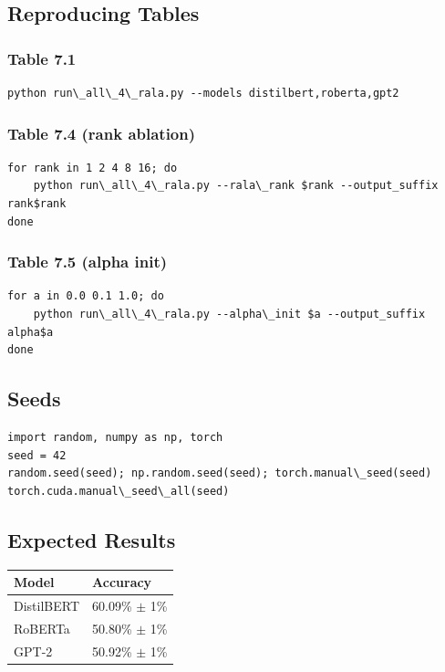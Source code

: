 \subsection{Reproducing Tables}

\subsubsection{Table 7.1}

\begin{lstlisting}
python run\_all\_4\_rala.py --models distilbert,roberta,gpt2
\end{lstlisting}

\subsubsection{Table 7.4 (rank ablation)}

\begin{lstlisting}
for rank in 1 2 4 8 16; do
    python run\_all\_4\_rala.py --rala\_rank $rank --output_suffix rank$rank
done
\end{lstlisting}

\subsubsection{Table 7.5 (alpha init)}

\begin{lstlisting}
for a in 0.0 0.1 1.0; do
    python run\_all\_4\_rala.py --alpha\_init $a --output_suffix alpha$a
done
\end{lstlisting}

\subsection{Seeds}

\begin{lstlisting}
import random, numpy as np, torch
seed = 42
random.seed(seed); np.random.seed(seed); torch.manual\_seed(seed)
torch.cuda.manual\_seed\_all(seed)
\end{lstlisting}

\subsection{Expected Results}

\begin{table}[H]
\centering
\small
\begin{tabular}{ll}
\toprule
\textbf{Model} & \textbf{Accuracy} \\
\midrule
DistilBERT & 60.09\% $\pm$ 1\% \\
RoBERTa & 50.80\% $\pm$ 1\% \\
GPT-2 & 50.92\% $\pm$ 1\% \\
\bottomrule
\end{tabular}
\end{table}

